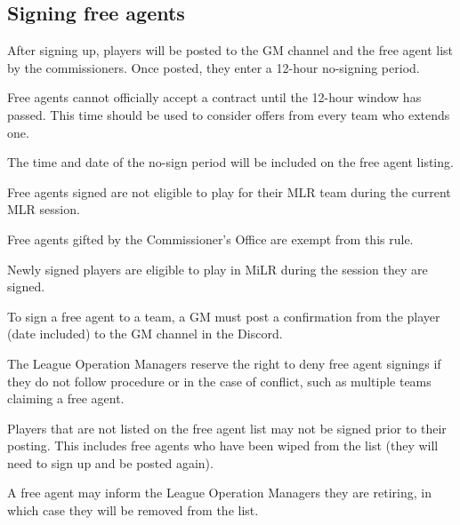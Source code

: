 \subsection{Signing free agents}
\begin{deepEnumerate}
	\item After signing up, players will be posted to the GM channel and the free agent list by the commissioners. Once posted, they enter a 12-hour no-signing period.
	\begin{deepEnumerate}
		\item Free agents cannot officially accept a contract until the 12-hour window has passed.
		This time should be used to consider offers from every team who extends one.
		\item The time and date of the no-sign period will be included on the free agent listing.
	\end{deepEnumerate}
	\item Free agents signed are not eligible to play for their MLR team during the current MLR session.
	\begin{deepEnumerate}
		\item Free agents gifted by the Commissioner's Office are exempt from this rule.
		\item Newly signed players are eligible to play in MiLR during the session they are signed.
	\end{deepEnumerate}
	\item To sign a free agent to a team, a GM must post a confirmation from the player	(date included) to the GM channel in the Discord.
	\item The League Operation Managers reserve the right to deny free agent signings if they do not follow procedure or in the case of conflict,
	such as multiple teams claiming a free agent.
	\item Players that are not listed on the free agent list may not be signed prior to their posting.
	This includes free agents who have been wiped from the list	(they will need to sign up and be posted again).
	\item A free agent may inform the League Operation Managers they are retiring, in which case they will be removed from the list.
\end{deepEnumerate}

